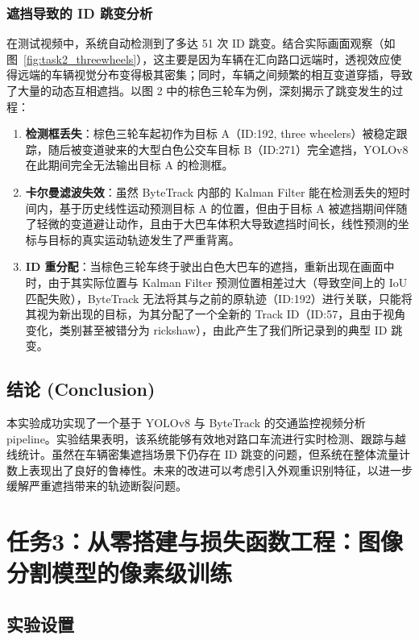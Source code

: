 \documentclass{article}
\begin{document}
\subsubsection{遮挡导致的 ID 跳变分析}
在测试视频中，系统自动检测到了多达 51 次 ID 跳变。结合实际画面观察（如图~\ref{fig:task2_threewheels}），这主要是因为车辆在汇向路口远端时，透视效应使得远端的车辆视觉分布变得极其密集；同时，车辆之间频繁的相互变道穿插，导致了大量的动态互相遮挡。以图 2 中的棕色三轮车为例，深刻揭示了跳变发生的过程：
\begin{enumerate}
    \item \textbf{检测框丢失}：棕色三轮车起初作为目标 A（ID:192, three wheelers）被稳定跟踪，随后被变道驶来的大型白色公交车目标 B（ID:271）完全遮挡，YOLOv8 在此期间完全无法输出目标 A 的检测框。
    \item \textbf{卡尔曼滤波失效}：虽然 ByteTrack 内部的 Kalman Filter 能在检测丢失的短时间内，基于历史线性运动预测目标 A 的位置，但由于目标 A 被遮挡期间伴随了轻微的变道避让动作，且由于大巴车体积大导致遮挡时间长，线性预测的坐标与目标的真实运动轨迹发生了严重背离。
    \item \textbf{ID 重分配}：当棕色三轮车终于驶出白色大巴车的遮挡，重新出现在画面中时，由于其实际位置与 Kalman Filter 预测位置相差过大（导致空间上的 IoU 匹配失败），ByteTrack 无法将其与之前的原轨迹（ID:192）进行关联，只能将其视为新出现的目标，为其分配了一个全新的 Track ID（ID:57，且由于视角变化，类别甚至被错分为 rickshaw），由此产生了我们所记录到的典型 ID 跳变。
\end{enumerate}

\subsection{结论 (Conclusion)}

本实验成功实现了一个基于 YOLOv8 与 ByteTrack 的交通监控视频分析 pipeline。实验结果表明，该系统能够有效地对路口车流进行实时检测、跟踪与越线统计。虽然在车辆密集遮挡场景下仍存在 ID 跳变的问题，但系统在整体流量计数上表现出了良好的鲁棒性。未来的改进可以考虑引入外观重识别特征，以进一步缓解严重遮挡带来的轨迹断裂问题。

\section{任务3：从零搭建与损失函数工程：图像分割模型的像素级训练}

\subsection{实验设置}
\end{document}
